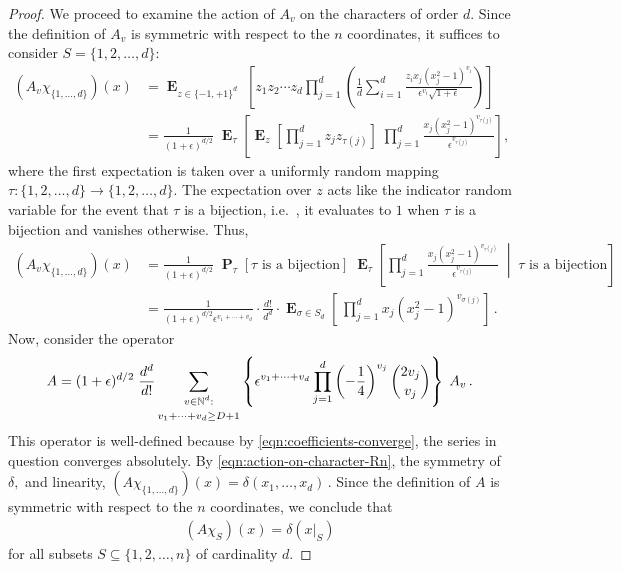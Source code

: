\documentclass[10pt]{article}
\theoremstyle{definition}
\providecommand{\ie}{i.e.\ }
\numberwithin{equation}{section}
\newcommand{\moo}{\{-1,+1\}}
\newcommand{\oneton}{\{1,2,\dots,n\}}
\newcommand{\BRACES}[1]{\left\{#1\right\}}
\newcommand{\PARENS}[1]{\left(#1\right)}
\DeclareMathOperator*{\Exp}{\mathbf{E}}
\DeclareMathOperator*{\Prob}{\mathbf{P}}
\begin{document}
\begin{proof}
We proceed to examine the action of $A_v$ on the
characters of order $d$. Since the definition of $A_v$
is symmetric with respect to the $n$ coordinates, it
suffices to consider
$S=\{1,2,\dots,d\}$:
\begin{align*}
(A_v\chi_{\{1,\dots,d\}})(x)
 &=
\Exp_{z\in\moo^d} \;
\left[z_1z_2\cdots z_d \prod_{j=1}^d\left(
\frac1d\sum_{i=1}^d
\frac{z_ix_j(x_j^2-1)^{v_i}}
{\epsilon^{v_i}
\sqrt{1+\epsilon}
}
\right)
\right]
\\
&=
\frac1{(1+\epsilon)^{d/2}}\;
 \Exp_{\tau} 
\left[\Exp_{z}\left[\prod_{j=1}^d z_j
z_{\tau(j)}\right]\;\prod_{j=1}^d
\frac{x_j(x_j^2-1)^{v_{\tau(j)}}}
     {\epsilon^{v_{\tau(j)}}} 
\right],
\end{align*}
where the first expectation is taken over a uniformly
random mapping $\tau\colon \{1,2,\dots,d\}\to\{1,2,\dots,d\}$. 
The expectation over $z$ acts like the
indicator random variable for the event that $\tau$ is a bijection,
\ie, it evaluates to $1$ when $\tau$ is a bijection and
vanishes otherwise.  Thus,
\begin{align}
(A_v\chi_{\{1,\dots,d\}})(x)
&=
\frac1{(1+\epsilon)^{d/2}}\;
\Prob_\tau[\text{$\tau$ is a bijection}] \;
\Exp_{\tau} 
\left[\prod_{j=1}^d
\frac{x_j(x_j^2-1)^{v_{\tau(j)}}}
     {\epsilon^{v_{\tau(j)}}} \;
\middle| \; \text{$\tau$ is a bijection}\right]\nonumber\\
&=
\frac1{(1+\epsilon)^{d/2}\epsilon^{v_1+\cdots+v_d}}
\cdot \frac{d!}{d^d}\cdot
\Exp_{\sigma\in S_d} 
\left[\,\prod_{j=1}^d x_j(x_j^2-1)^{v_{\sigma(j)}}\right]\,.
\label{eqn:action-on-character-Rn}
\end{align}
Now, consider the operator
\begin{align*}
A= 
(1+\epsilon)^{d/2}\;\frac{d^d}{d!}\sum_{\substack{\rule{0mm}{2mm}v\in\mathbb
N^d:\\\rule{0mm}{3mm}v_1+\cdots+v_d\geq D+1}} 
 \BRACES{\epsilon^{v_1+\cdots+v_d}
\prod_{j=1}^d\PARENS{-\frac14}^{v_j}{2v_j \choose v_j}}
  \; A_v\,.
\end{align*}
This operator is well-defined because by 
\eqref{eqn:coefficients-converge},
the series in question converges absolutely.
By \eqref{eqn:action-on-character-Rn}, the symmetry
of $\delta,$ and linearity,
$
(A\chi_{\{1,\dots,d\}})(x)=\delta(x_1,\dots,x_d)\,.
$
Since the definition of $A$ is symmetric with respect to
the $n$ coordinates, we conclude that
\begin{align*}
(A\chi_S)(x) = \delta(x|_S)
\end{align*}
for all subsets $S\subseteq\oneton$ of cardinality $d$.

\end{proof}
\end{document}
